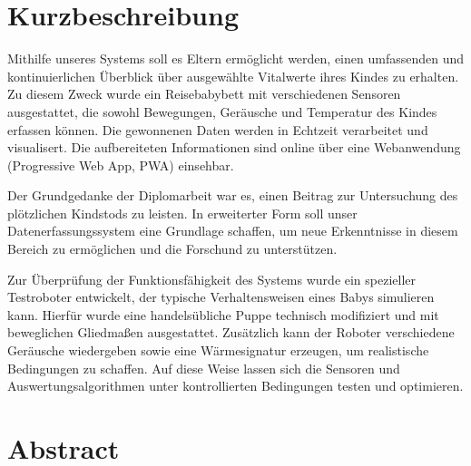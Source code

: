 \chapter*{Kurzbeschreibung}

Mithilfe unseres Systems soll es Eltern ermöglicht werden, einen umfassenden und kontinuierlichen Überblick über ausgewählte Vitalwerte ihres Kindes zu erhalten.
Zu diesem Zweck wurde ein Reisebabybett mit verschiedenen Sensoren ausgestattet, die sowohl Bewegungen, Geräusche und Temperatur des Kindes erfassen können.
Die gewonnenen Daten werden in Echtzeit verarbeitet und visualisert. Die aufbereiteten Informationen 
sind online über eine Webanwendung (Progressive Web App, PWA) einsehbar.
\par\vspace{1em}
\noindent
Der Grundgedanke der Diplomarbeit war es, einen Beitrag zur Untersuchung des plötzlichen Kindstods zu leisten.
In erweiterter Form soll unser Datenerfassungssystem eine Grundlage schaffen, um neue Erkenntnisse in diesem Bereich zu ermöglichen und die Forschund zu unterstützen. 
\par\vspace{1em}
\noindent
Zur Überprüfung der Funktionsfähigkeit des Systems wurde ein spezieller Testroboter entwickelt, der typische Verhaltensweisen eines Babys simulieren kann.
Hierfür wurde eine handelsübliche Puppe technisch modifiziert und mit beweglichen Gliedmaßen ausgestattet. Zusätzlich kann der Roboter verschiedene Geräusche wiedergeben sowie eine Wärmesignatur erzeugen,
um realistische Bedingungen zu schaffen.
Auf diese Weise lassen sich die Sensoren und Auswertungsalgorithmen unter kontrollierten Bedingungen testen und optimieren.
\newpage

\chapter*{Abstract}


